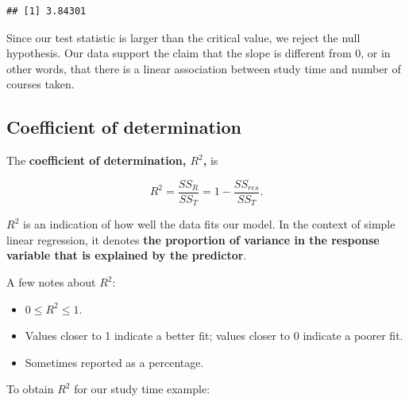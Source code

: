 \documentclass[
]{book}
\newenvironment{Shaded}{\begin{snugshade}}{\end{snugshade}}
\newcommand{\DecValTok}[1]{\textcolor[rgb]{0.00,0.00,0.81}{#1}}
\newcommand{\DocumentationTok}[1]{\textcolor[rgb]{0.56,0.35,0.01}{\textbf{\textit{#1}}}}
\newcommand{\FunctionTok}[1]{\textcolor[rgb]{0.13,0.29,0.53}{\textbf{#1}}}
\newcommand{\NormalTok}[1]{#1}
\newcommand{\OtherTok}[1]{\textcolor[rgb]{0.56,0.35,0.01}{#1}}
\newcommand{\SpecialCharTok}[1]{\textcolor[rgb]{0.81,0.36,0.00}{\textbf{#1}}}
\newcommand{\StringTok}[1]{\textcolor[rgb]{0.31,0.60,0.02}{#1}}
\providecommand{\tightlist}{%
  \setlength{\itemsep}{0pt}\setlength{\parskip}{0pt}}
\begin{document}
\begin{verbatim}
## [1] 3.84301
\end{verbatim}

Since our test statistic is larger than the critical value, we reject the null hypothesis. Our data support the claim that the slope is different from 0, or in other words, that there is a linear association between study time and number of courses taken.

\hypertarget{coefficient-of-determination}{%
\subsection{Coefficient of determination}\label{coefficient-of-determination}}

The \textbf{coefficient of determination, \(R^2\),} is

\begin{equation}
R^{2} = \frac{SS_R}{SS_T} = 1 - \frac{SS_{res}}{SS_T}.
\label{eq:R2}
\end{equation}

\(R^{2}\) is an indication of how well the data fits our model. In the context of simple linear regression, it denotes \textbf{the proportion of variance in the response variable that is explained by the predictor}.

A few notes about \(R^2\):

\begin{itemize}
\tightlist
\item
  \(0 \leq R^2 \leq 1\).
\item
  Values closer to 1 indicate a better fit; values closer to 0 indicate a poorer fit.
\item
  Sometimes reported as a percentage.
\end{itemize}

To obtain \(R^2\) for our study time example:

\begin{Shaded}
\end{Shaded}
\end{document}
